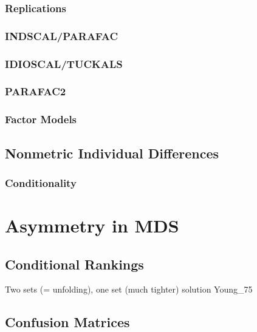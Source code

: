 \documentclass[
  12pt,
]{book}
\begin{document}
\subsection{Replications}\label{indifrepl}

\subsection{INDSCAL/PARAFAC}\label{indifindscal}

\subsection{IDIOSCAL/TUCKALS}\label{indifidioscal}

\subsection{PARAFAC2}\label{inddifparafac2}

\subsection{Factor Models}\label{inddiffa}

\section{Nonmetric Individual Differences}\label{nonmetric-individual-differences}

\subsection{Conditionality}\label{conditionality}

\chapter{Asymmetry in MDS}\label{asymmds}

\section{Conditional Rankings}\label{conditional-rankings}

Two sets (= unfolding), one set (much tighter) solution
Young\_75

\section{Confusion Matrices}\label{confusion-matrices}
\end{document}
